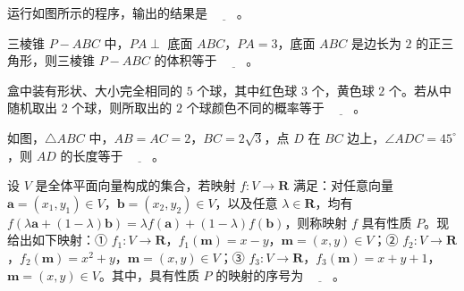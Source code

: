 \Needspace{0.4\textheight}
\begin{question}
运行如图所示的程序，输出的结果是 $\underline{\qquad}$。
\nopagebreak[4]
\begin{center}\end{center}
\nopagebreak[4]
\end{question}
\begin{question}
三棱锥 $P-ABC$ 中，$PA\perp$ 底面 $ABC$，$PA=3$，底面 $ABC$ 是边长为 $2$ 的正三角形，则三棱锥 $P-ABC$ 的体积等于 $\underline{\qquad}$。

\end{question}
\begin{question}
盒中装有形状、大小完全相同的 $5$ 个球，其中红色球 $3$ 个，黄色球 $2$ 个。若从中随机取出 $2$ 个球，则所取出的 $2$ 个球颜色不同的概率等于 $\underline{\qquad}$。

\Needspace{0.4\textheight}
\end{question}
\begin{question}
如图，$\triangle ABC$ 中，$AB=AC=2$，$BC=2\sqrt3$，点 $D$ 在 $BC$ 边上，$\angle ADC=45^\circ$，则 $AD$ 的长度等于 $\underline{\qquad}$。
\nopagebreak[4]
\begin{center}\end{center}
\nopagebreak[4]
\end{question}
\begin{question}
设 $V$ 是全体平面向量构成的集合，若映射 $f:V\to\mathbf R$ 满足：对任意向量 $\boldsymbol a=(x_1,y_1)\in V$，$\boldsymbol b=(x_2,y_2)\in V$，以及任意 $\lambda\in\mathbf R$，均有 $f(\lambda\boldsymbol a+(1-\lambda)\boldsymbol b)=\lambda f(\boldsymbol a)+(1-\lambda)f(\boldsymbol b)$，则称映射 $f$ 具有性质 $P$。现给出如下映射：① $f_1:V\to\mathbf R$，$f_1(\boldsymbol m)=x-y$，$\boldsymbol m=(x,y)\in V$；② $f_2:V\to\mathbf R$，$f_2(\boldsymbol m)=x^2+y$，$\boldsymbol m=(x,y)\in V$；③ $f_3:V\to\mathbf R$，$f_3(\boldsymbol m)=x+y+1$，$\boldsymbol m=(x,y)\in V$。其中，具有性质 $P$ 的映射的序号为 $\underline{\qquad}$。

\end{question}


